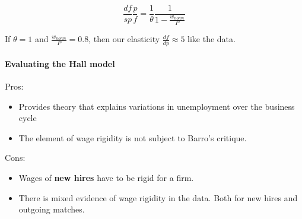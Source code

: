 \documentclass[11pt]{article}
\begin{document}
\[\dfrac{df}{sp}\dfrac{p}{f} = \dfrac{1}{\theta}\dfrac{1}{1-\frac{w_{norm}}{P}}\]

If $\theta=1$ and $\frac{w_{norm}}{P}=0.8$, then our elasticity $\frac{df}{dp}\approx 5$ like the data.


\begin{shaded}
\paragraph{Evaluating the Hall model} \mbox{}

Pros:
\begin{itemize}
\item Provides theory that explains variations in unemployment over the business cycle
\item The element of wage rigidity is not subject to Barro's critique.
\end{itemize}

Cons:
\begin{itemize}
\item Wages of \textbf{new hires} have to be rigid for a firm.
\item There is mixed evidence of wage rigidity in the data. Both for new hires and outgoing matches.
\end{itemize}

\end{shaded}









\clearpage
\newpage
\printbibliography
\end{document}
